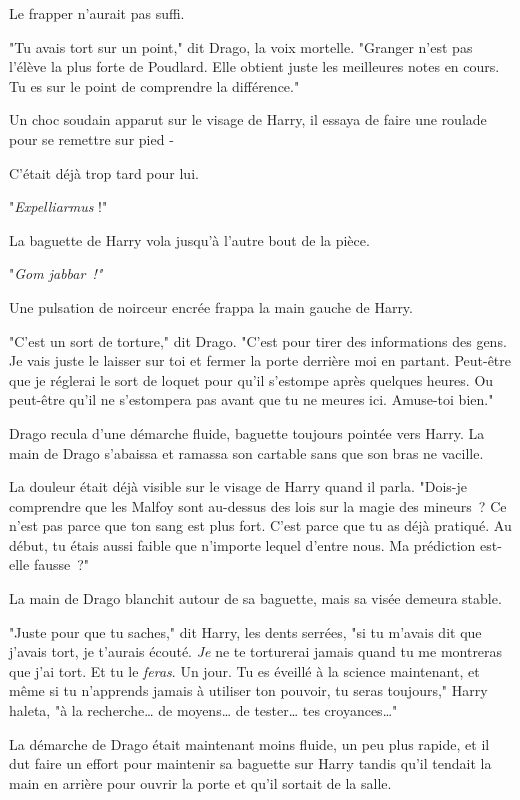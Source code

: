 Le frapper n'aurait pas suffi.

"Tu avais tort sur un point," dit Drago, la voix mortelle. "Granger n'est pas l'élève la plus forte de Poudlard. Elle obtient juste les meilleures notes en cours. Tu es sur le point de comprendre la différence."

Un choc soudain apparut sur le visage de Harry, il essaya de faire une roulade pour se remettre sur pied -

C'était déjà trop tard pour lui.

"\emph{Expelliarmus} !"

La baguette de Harry vola jusqu'à l'autre bout de la pièce.

"\emph{Gom jabbar~!"}

Une pulsation de noirceur encrée frappa la main gauche de Harry.

"C'est un sort de torture," dit Drago. "C'est pour tirer des informations des gens. Je vais juste le laisser sur toi et fermer la porte derrière moi en partant. Peut-être que je réglerai le sort de loquet pour qu'il s'estompe après quelques heures. Ou peut-être qu'il ne s'estompera pas avant que tu ne meures ici. Amuse-toi bien."

Drago recula d'une démarche fluide, baguette toujours pointée vers Harry. La main de Drago s'abaissa et ramassa son cartable sans que son bras ne vacille.

La douleur était déjà visible sur le visage de Harry quand il parla. "Dois-je comprendre que les Malfoy sont au-dessus des lois sur la magie des mineurs~? Ce n'est pas parce que ton sang est plus fort. C'est parce que tu as déjà pratiqué. Au début, tu étais aussi faible que n'importe lequel d'entre nous. Ma prédiction est-elle fausse~?"

La main de Drago blanchit autour de sa baguette, mais sa visée demeura stable.

"Juste pour que tu saches," dit Harry, les dents serrées, "si tu m'avais dit que j'avais tort, je t'aurais écouté. \emph{Je} ne te torturerai jamais quand tu me montreras que j'ai tort. Et tu le \emph{feras}. Un jour. Tu es éveillé à la science maintenant, et même si tu n'apprends jamais à utiliser ton pouvoir, tu seras toujours," Harry haleta, "à la recherche… de moyens… de tester… tes croyances…"

La démarche de Drago était maintenant moins fluide, un peu plus rapide, et il dut faire un effort pour maintenir sa baguette sur Harry tandis qu'il tendait la main en arrière pour ouvrir la porte et qu'il sortait de la salle.

